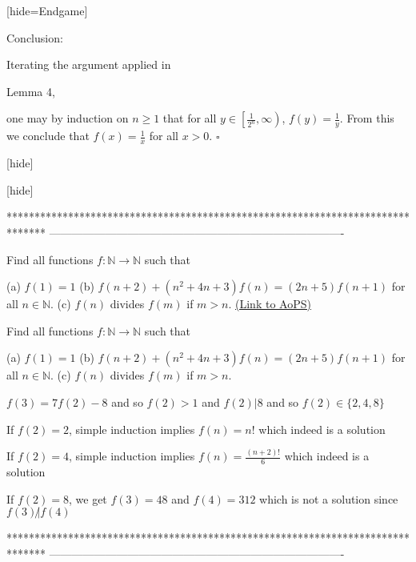 \begin{solution}

[hide=Endgame] \begin{bolded}Conclusion:\end{bolded} Iterating the argument applied in \begin{bolded}Lemma 4,\end{bolded} one may by induction on $n \ge 1$ that for all $y \in \left[\frac{1}{2^n}, \infty \right)$, $f(y)=\frac{1}{y}$. From this we conclude that $f(x)=\frac{1}{x}$ for all $x>0$. $\square$


[\/hide]

[\/hide]
\end{solution}
*******************************************************************************
-------------------------------------------------------------------------------

\begin{problem}
	Find all functions $f: \mathbb{N} \rightarrow \mathbb{N}$ such that

(a) $f(1)=1$
(b) $f(n+2)+(n^2+4n+3)f(n)=(2n+5)f(n+1)$ for all $n \in \mathbb{N}$. 
(c) $f(n)$ divides $f(m)$ if $m>n$.
	\flushright \href{https://artofproblemsolving.com/community/c6h590835}{(Link to AoPS)}
\end{problem}



\begin{solution}
	\begin{tcolorbox}Find all functions $f: \mathbb{N} \rightarrow \mathbb{N}$ such that

(a) $f(1)=1$
(b) $f(n+2)+(n^2+4n+3)f(n)=(2n+5)f(n+1)$ for all $n \in \mathbb{N}$. 
(c) $f(n)$ divides $f(m)$ if $m>n$.\end{tcolorbox}
$f(3)=7f(2)-8$ and so $f(2)>1$ and $f(2)|8$ and so $f(2)\in\{2,4,8\}$

If $f(2)=2$, simple induction implies $\boxed{f(n)=n!}$ which indeed is a solution

If $f(2)=4$, simple induction implies $\boxed{f(n)=\frac{(n+2)!}6}$ which indeed is a solution

If $f(2)=8$, we get $f(3)=48$ and $f(4)=312$ which is not a solution since $f(3)\not|f(4)$
\end{solution}
*******************************************************************************
-------------------------------------------------------------------------------

